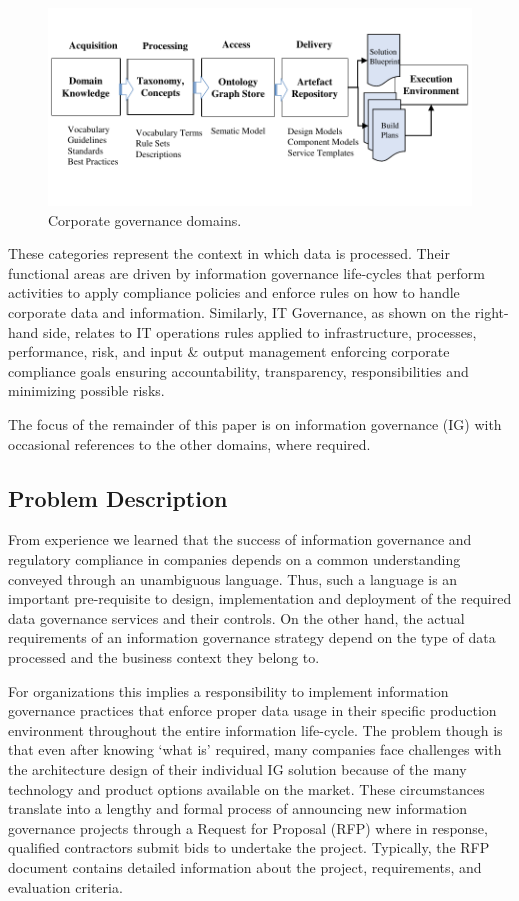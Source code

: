 \documentclass[runningheads]{llncs}
\begin{document}
 \begin{figure}
\includegraphics[width=\linewidth]{IGSModelsMedium.pdf}
\caption{Corporate governance domains.} \label{fig2}
\end{figure}

These categories represent the context in which data is processed. Their functional areas are driven by information governance life-cycles that perform activities to apply compliance policies and enforce rules on how to handle corporate data and information. Similarly, IT Governance, as shown on the right-hand side, relates to IT operations rules applied to infrastructure, processes, performance, risk, and input \& output management enforcing corporate compliance goals ensuring accountability, transparency, responsibilities and minimizing possible risks.

The focus of the remainder of this paper is on information governance (IG) with occasional references to the other domains, where required. 

\subsection{Problem Description} 
From experience we learned that the success of information governance and regulatory compliance in companies depends on a common understanding conveyed through an unambiguous language. Thus, such a language is an important pre-requisite to design, implementation and deployment of the required data governance services and their controls. On the other hand, the actual requirements of an information governance strategy depend on the type of data processed and the business context they belong to. 

For organizations this implies a responsibility to implement information governance practices that enforce proper data usage in their specific production environment throughout the entire information life-cycle. The problem though is that even after knowing ‘what is’ required, many companies face challenges with the architecture design of their individual IG solution because of the many technology and product options available on the market. These circumstances translate into a lengthy and formal process of announcing new information governance projects through a Request for Proposal (RFP) where in response, qualified contractors submit bids to undertake the project. Typically, the RFP document contains detailed information about the project, requirements, and evaluation criteria.
\end{document}
